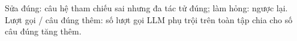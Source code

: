 Sửa đúng: câu hệ tham chiếu sai nhưng đa tác tử đúng; làm hỏng: ngược lại. Lượt gọi / câu đúng thêm: số lượt gọi LLM phụ trội trên toàn tập chia cho số câu đúng tăng thêm.
